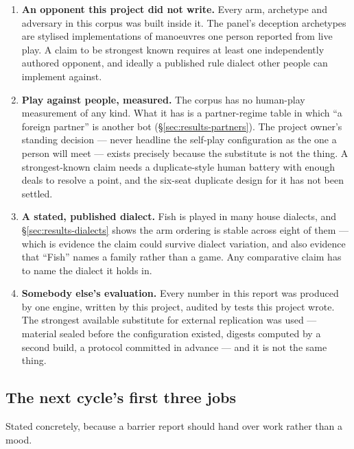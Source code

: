 \begin{enumerate}

\item \textbf{An opponent this project did not write.} Every arm, archetype and adversary in this
  corpus was built inside it. The panel's deception archetypes are stylised implementations of
  manoeuvres one person reported from live play. A claim to be strongest known requires at least one
  independently authored opponent, and ideally a published rule dialect other people can implement
  against.

\item \textbf{Play against people, measured.} The corpus has no human-play measurement of any kind.
  What it has is a partner-regime table in which ``a foreign partner'' is another bot
  (\S\ref{sec:results-partners}). The project owner's standing decision --- never headline the
  self-play configuration as the one a person will meet --- exists precisely because the substitute is
  not the thing. A strongest-known claim needs a duplicate-style human battery with enough deals to
  resolve a point, and the six-seat duplicate design for it has not been settled.

\item \textbf{A stated, published dialect.} Fish is played in many house dialects, and
  \S\ref{sec:results-dialects} shows the arm ordering is stable across eight of them --- which is
  evidence the claim could survive dialect variation, and also evidence that ``Fish'' names a family
  rather than a game. Any comparative claim has to name the dialect it holds in.

\item \textbf{Somebody else's evaluation.} Every number in this report was produced by one engine,
  written by this project, audited by tests this project wrote. The strongest available substitute for
  external replication was used --- material sealed before the configuration existed, digests computed
  by a second build, a protocol committed in advance --- and it is not the same thing.

\end{enumerate}

\subsection{The next cycle's first three jobs}
\label{sec:towardone-next}

Stated concretely, because a barrier report should hand over work rather than a mood.

